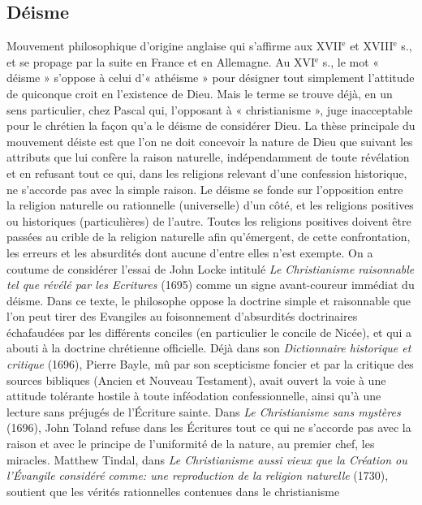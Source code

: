 \subsection{Déisme}
Mouvement philosophique d’origine
anglaise qui s'affirme aux {\footnotesize XVII}$^\text{e}$ et
{\footnotesize XVIII}$^\text{e}$ s., et se propage par la suite en France
et en Allemagne. Au {\footnotesize XVI}$^\text{e}$ s., le mot « déisme »
s’oppose à celui d’« athéisme » pour
désigner tout simplement l'attitude de
quiconque croit en l’existence de Dieu.
Mais le terme se trouve déjà, en un sens
particulier, chez Pascal qui, l’opposant à
« christianisme », juge inacceptable pour
le chrétien la façon qu’a le déisme de
considérer Dieu. La thèse principale du
mouvement déiste est que l’on ne doit
concevoir la nature de Dieu que suivant
les attributs que lui confère la raison naturelle,
indépendamment de toute révélation
et en refusant tout ce qui, dans les
religions relevant d’une confession historique,
ne s’accorde pas avec la simple raison.
Le déisme se fonde sur l’opposition
entre la religion naturelle ou rationnelle
(universelle) d’un côté, et les religions
positives ou historiques (particulières) de
l’autre. Toutes les religions positives doivent
être passées au crible de la religion
naturelle afin qu’émergent, de cette
confrontation, les erreurs et les absurdités
dont aucune d’entre elles n’est exempte.
On a coutume de considérer l’essai de
John Locke intitulé {\it Le Christianisme raisonnable
tel que révélé par les Ecritures}
(1695) comme un signe avant-coureur
immédiat du déisme. Dans ce texte, le
philosophe oppose la doctrine simple et
raisonnable que l’on peut tirer des Evangiles
au foisonnement d’absurdités doctrinaires
échafaudées par les différents
conciles (en particulier le concile de
Nicée), et qui a abouti à la doctrine chrétienne
officielle. Déjà dans son {\it Dictionnaire
historique et critique} (1696), Pierre
Bayle, mû par son scepticisme foncier et
par la critique des sources bibliques
(Ancien et Nouveau Testament), avait
ouvert la voie à une attitude tolérante
hostile à toute inféodation confessionnelle,
ainsi qu’à une lecture sans préjugés
de l’Écriture sainte. Dans {\it Le Christianisme
sans mystères} (1696), John Toland
refuse dans les Écritures tout ce qui ne
s’accorde pas avec la raison et avec le
principe de l’uniformité de la nature, au
premier chef, les miracles. Matthew Tindal,
dans {\it Le Christianisme aussi vieux que
la Création ou l'Évangile considéré
comme: une reproduction de la religion
naturelle} (1730), soutient que les vérités
rationnelles contenues dans le christianisme
